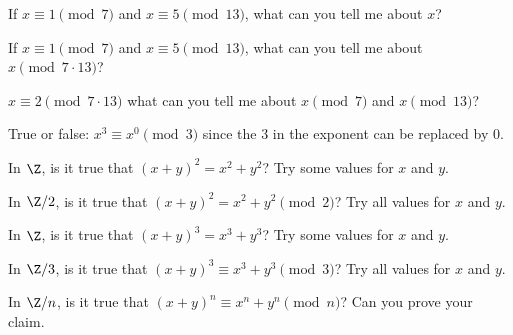   \mbox{}
  \begin{myenum}
  \item If $x \equiv 1 \pmod{7}$ and $x \equiv 5 \pmod{13}$, what can you tell me about $x$?
  \item If $x \equiv 1 \pmod{7}$ and $x \equiv 5 \pmod{13}$, what can you tell me about $x \pmod{7 \cdot 13}$?
  \item $x \equiv 2 \pmod{7 \cdot 13}$
    what can you tell me about
    $x \pmod{7}$ and $x \pmod{13}$?
  \item True or false: $x^3 \equiv x^0 \pmod{3}$ since the $3$ in the exponent can be replaced by $0$.
  \item In $\Z$, is it true that $(x + y)^2 = x^2 + y^2$? Try some values for $x$ and $y$.
  \item In $\Z/2$, is it true that $(x + y)^2 = x^2 + y^2 \pmod{2}$? Try all values for $x$ and $y$.
  \item In $\Z$, is it true that $(x + y)^3 = x^3 + y^3$? Try some values for $x$ and $y$.
  \item In $\Z/3$, is it true that $(x + y)^3 \equiv x^3 + y^3 \pmod{3}$? Try all values for $x$ and $y$.
  \item In $\Z/n$, is it true that $(x + y)^n \equiv x^n + y^n \pmod{n}$? Can you prove your claim.
  \end{myenum}
